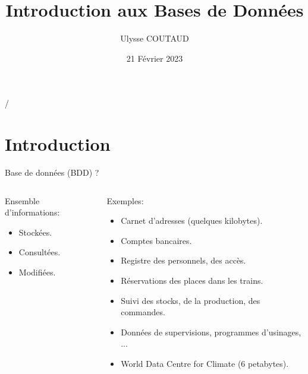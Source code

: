 \documentclass[xetex,dvipsnames]{beamer}
\begin{document}
\title{Introduction aux Bases de Données}

 {   \hspace{1em} \insertframenumber/\inserttotalframenumber }

\author{Ulysse COUTAUD}

\date{21 Février 2023}
	
\maketitle

\section{Introduction}

\begin{frame}{Base de données (BDD) ?}
    \begin{columns}
	    \begin{column}{0.5\textwidth}
	    Ensemble d'informations:
		 	\begin{itemize}
		 		\item Stockées.
		 		\item Consultées.
		 		\item Modifiées.
		 	\end{itemize}
		\end{column}
		\begin{column}{0.5\textwidth}
\begin{footnotesize}
		Exemples:
			\begin{itemize}
		 		\item Carnet d'adresses (quelques kilobytes).
		 		\item Comptes bancaires.
		 		\item Registre des personnels, des accès.
		 		\item Réservations des places dans les trains.
		 		\item Suivi des stocks, de la production, des commandes.
		 		\item Données de supervisions, programmes d'usinages, ...
		 		\item World Data Centre for Climate (6 petabytes).
		 	\end{itemize}
\end{footnotesize}
		\end{column}
	\end{columns}
		
\end{frame}
\end{document}
